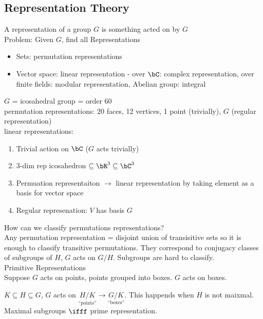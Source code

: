 
\subsection{Representation Theory} 

A representation of a group $G$ is something acted on by $G$ \\
Problem: Given $G$, find all Representations 
\begin{itemize}
    \item Sets: permutation representations
    \item Vector space: linear representation - over $\bC$: complex representation, over finite fields: modular representation, Abelian group: integral
\end{itemize}

\begin{example}
    $G$ = icosahedral group = order 60 \\
    permutation representations: 20 faces, 12 vertices, 1 point (trivially), $G$ (regular representation) \\
    linear representations: 
    \begin{enumerate}
        \item Trivial action on $\bC$ ($G$ acts trivially) 
        \item 3-dim rep \quad icosahedron $\subseteq \bR^3 \subseteq \bC^3$ 
        \item Permuation representaiton $\to$ linear representation by taking element as a basis for vector space 
        \item Regular represenation: $V$ has basis $G$ 
    \end{enumerate}
\end{example}

\noindent
How can we classify permutations representations? \\
Any permutation representation = disjoint union of transisitive sets so it is enough to classify transitive permutations. They correspond to conjugacy classes of subgroups of $H$, $G$ acts on $G/H$. Subgroups are hard to classify. \\

\noindent 
Primitive Representations \\
Suppose $G$ acts on points, points grouped into boxes. $G$ acts on boxes. \\
\begin{example}
    $K \subseteq H \subseteq G$, $G$ acts on $\underset{\text{``points''}}{H/K} \to \underset{\text{``boxes''}}{G/K}$. This happends when $H$ is not maixmal. Maximal subgroups $\ifff$ prime representation. 
\end{example}

